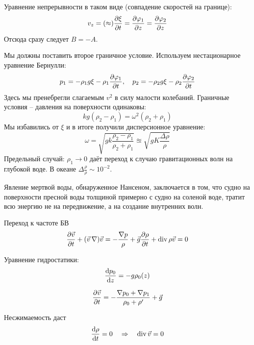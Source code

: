 Уравнение непрерывности в таком виде (совпадение скоростей на границе):
\begin{equation}
    v_z = (\approx) \pdv{\xi}{t} = \pdv{\varphi_1}{z} = \pdv{\varphi_2}{z}
\end{equation}
Отсюда сразу следует $B = -A$.

Мы должны поставить второе граничное условие. Используем нестационарное уравнение Бернулли:
\begin{equation}
    p_1 = -\rho_1 g \xi - \rho_1 \pdv{\varphi_1}{t}, \quad
    p_2 = -\rho_2 g \xi - \rho_2 \pdv{\varphi_2}{t}
\end{equation}
Здесь мы пренебрегли слагаемым $v^2$ в силу малости колебаний.
Граничные условия -- давления на поверхности одинаковы:
\begin{equation}
    kg(\rho_2-\rho_1) = \omega^2(\rho_2+\rho_1)
\end{equation}
Мы избавились от $\xi$ и в итоге получили дисперсионное уравнение:
\begin{equation}
    \omega = \sqrt{gk\frac{\rho_2-\rho_1}{\rho_2+\rho_1}} \approxeq \sqrt{gK\frac{\Delta \rho}{\rho}}
\end{equation}
Предельный случай: $\rho_1 \to 0$ даёт переход к случаю гравитационных волн на глубокой воде. 
В океане $\Delta \frac{\rho}{\rho}\sim 10^{-2}$.

Явление мертвой воды, обнаруженное Нансеном, заключается в том, что судно на поверхности пресной воды толщиной примерно с судно на соленой воде, тратит всю энергию не на передвижение, а на создание внутренних волн.

Переход к частоте БВ
\begin{equation}
    \pdv{\vec{v}}{t}+(\vec{v}\,\nabla)\vec{v} = -\frac{\nabla p}{\rho}+\vec{g}\\
    \pdv{\rho}{t}+\operatorname{div} \rho \vec{v} = 0
\end{equation}

Уравнение гидростатики:
\begin{equation}
    \dv{p_0}{z} = -g \rho_0(z)
\end{equation}

\begin{equation}
    \pdv{\vec{v}}{t} = -\frac{\nabla p_0+\nabla p_1}{\rho_0+\rho'}+\vec{g}
\end{equation}

Несжимаемость даст
\begin{equation}
    \dv{\rho}{t} = 0 \quad \Rightarrow \quad
    \operatorname{div} \vec{v} = 0
\end{equation}

